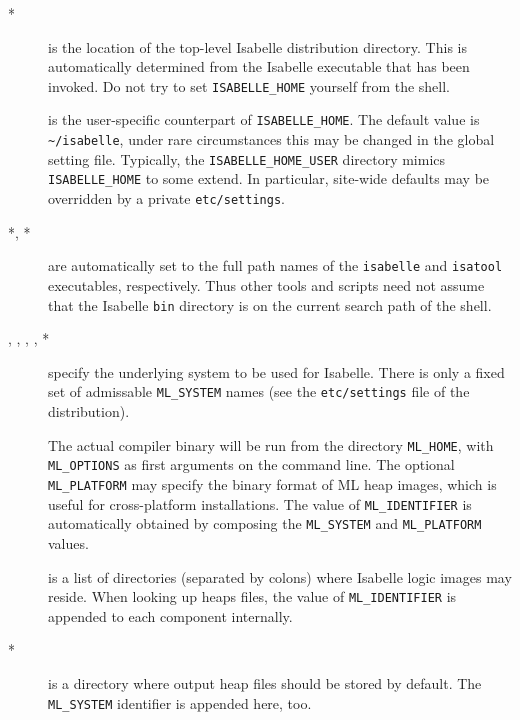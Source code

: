 \begin{description}
\item[*] is the location of the top-level Isabelle
  distribution directory. This is automatically determined from the Isabelle
  executable that has been invoked.  Do not try to set \texttt{ISABELLE_HOME}
  yourself from the shell.
  
\item[] is the user-specific counterpart of
  \texttt{ISABELLE_HOME}. The default value is \texttt{\~\relax/isabelle},
  under rare circumstances this may be changed in the global setting file.
  Typically, the \texttt{ISABELLE_HOME_USER} directory mimics
  \texttt{ISABELLE_HOME} to some extend. In particular, site-wide defaults may
  be overridden by a private \texttt{etc/settings}.
  
\item[*, *] are automatically set to the full
  path names of the \texttt{isabelle} and \texttt{isatool} executables,
  respectively.  Thus other tools and scripts need not assume that the
  Isabelle \texttt{bin} directory is on the current search path of the shell.
  
\item[, , ,
  , *] specify the underlying {\ML}
  system to be used for Isabelle.  There is only a fixed set of admissable
  \texttt{ML_SYSTEM} names (see the \texttt{etc/settings} file of the
  distribution).
  
  The actual compiler binary will be run from the directory \texttt{ML_HOME},
  with \texttt{ML_OPTIONS} as first arguments on the command line.  The
  optional \texttt{ML_PLATFORM} may specify the binary format of ML heap
  images, which is useful for cross-platform installations.  The value of
  \texttt{ML_IDENTIFIER} is automatically obtained by composing the
  \texttt{ML_SYSTEM} and \texttt{ML_PLATFORM} values.
  
\item[] is a list of directories (separated by colons)
  where Isabelle logic images may reside.  When looking up heaps files, the
  value of \texttt{ML_IDENTIFIER} is appended to each component internally.
  
\item[*] is a directory where output heap files should
  be stored by default. The \texttt{ML_SYSTEM} identifier is appended here,
  too.
  

\end{description}
